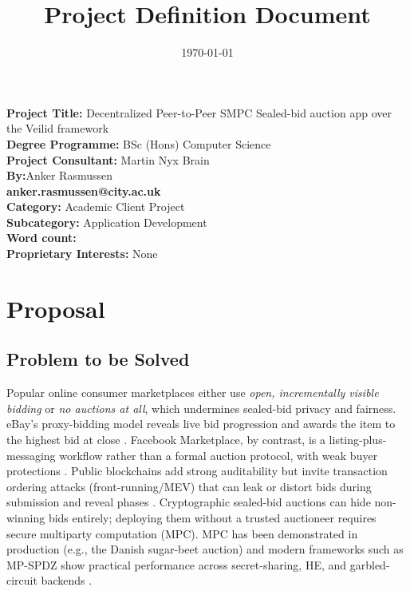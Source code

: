 \documentclass[12pt,a4paper]{article}
\title{Project Definition Document}
\author{}
\date{\today}
\newcommand{\wordcount}{}
\begin{document}
\maketitle

\begin{center}
\textbf {Project Title:} {Decentralized Peer-to-Peer SMPC Sealed-bid auction app over the Veilid framework} \\[1cm]
\textbf{Degree Programme:} {BSc (Hons) Computer Science} \\[1cm]
\textbf{Project Consultant:} {Martin Nyx Brain} \\[1cm]
\textbf{By:}{Anker Rasmussen} \\[0.2cm]
{\small \textbf{anker.rasmussen@city.ac.uk}} \\ [0.3cm]
\textbf{Category:} Academic Client Project \\[0.3cm]
{\small \textbf{Subcategory:} Application Development} \\[1cm]
\textbf {Word count:}\wordcount\\[0.3cm]
\textbf {Proprietary Interests:} None
\end{center}

\newpage


\section{Proposal}

\subsection{Problem to be Solved}
Popular online consumer marketplaces either use \emph{open, incrementally visible bidding} or \emph{no auctions at all}, which undermines sealed-bid privacy and fairness. eBay’s proxy-bidding model reveals live bid progression and awards the item to the highest bid at close \parencite{ebay_help_bidding}. Facebook Marketplace, by contrast, is a listing-plus-messaging workflow rather than a formal auction protocol, with weak buyer protections \parencite{fb_marketplace_help}. Public blockchains add strong auditability but invite transaction ordering attacks (front-running/MEV) that can leak or distort bids during submission and reveal phases \parencite{daian2019_flashboys2}. Cryptographic sealed-bid auctions can hide non-winning bids entirely; deploying them without a trusted auctioneer requires secure multiparty computation (MPC). MPC has been demonstrated in production (e.g., the Danish sugar-beet auction) and modern frameworks such as MP-SPDZ show practical performance across secret-sharing, HE, and garbled-circuit backends \parencite{bogetoft2009_mpc_live,mp-spdz,damgaard2012_spdz,evans2018_pragmatic_mpc,sako2000_hide_losers}.
\end{document}
